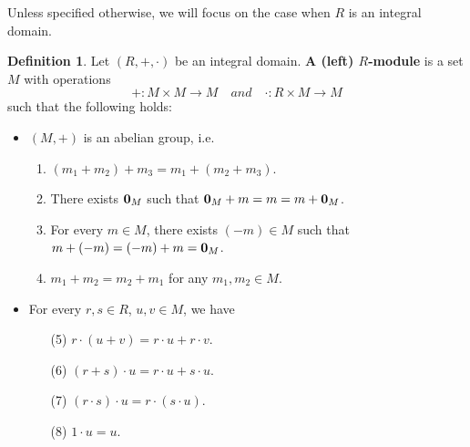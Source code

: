 \documentclass[11pt,openany]{book}
\theoremstyle{plain}
\theoremstyle{definition}
\newtheorem{definition}[definition]{Definition}
\theoremstyle{remark}
\begin{document}
Unless specified otherwise, we will focus on the case when $R$ is an integral domain.


\begin{definition} \label{def-module}
    Let $(R,+,\cdot)$ be an integral domain. {\bf A (left) $R$-module} is a set $M$ with operations
    $$+: M \times M \to M \quad and \quad \cdot : R \times M \to M$$
    such that the following holds:
    \begin{itemize}
        \item $(M,+)$ is an abelian group, i.e.
            \begin{enumerate}
                \item $(m_1+m_2)+m_3 = m_1+(m_2+m_3)$.
                \item There exists ${\bf 0}_{M}$ such that ${\bf 0}_{M}+m = m = m+{\bf 0}_{M}$.
                \item For every $m \in M$, there exists $(-m) \in M$ such that $m+(-m) = (-m)+m = {\bf 0}_{M}$.
                \item $m_1+m_2 = m_2+m_1$ for any $m_1, m_2 \in M$.
            \end{enumerate}
        \item For every $r,s \in R$, $u,v \in M$, we have
            \begin{enumerate}
                \item[(5)] $r \cdot (u+v) = r \cdot u + r \cdot v$.
                \item[(6)] $(r+s) \cdot u = r \cdot u + s \cdot u$.
                \item[(7)] $(r \cdot s) \cdot u = r \cdot (s \cdot u)$.
                \item[(8)] $1 \cdot u = u$.
            \end{enumerate}
    \end{itemize}
\end{definition}
\end{document}
